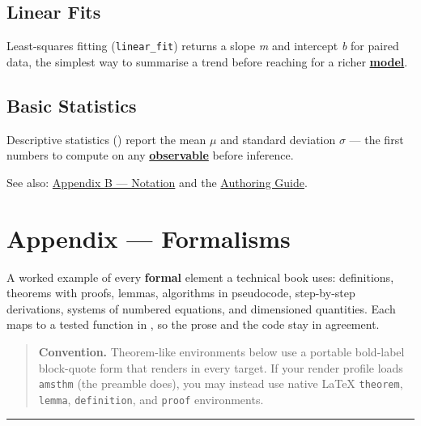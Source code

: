 \documentclass[
]{article}
\theoremstyle{plain}
\theoremstyle{definition}
\begin{document}
\subsection{Linear Fits}\label{linear-fits}

Least-squares fitting (\texttt{linear\_fit}) returns a slope \emph{m}
and intercept \emph{b} for paired data, the simplest way to summarise a
trend before reaching for a richer
\href{../glossary.md\#gl:model}{\textbf{model}}.

\subsection{Basic Statistics}\label{basic-statistics}

Descriptive statistics () report the
mean \emph{\texorpdfstring{\ensuremath{\mu}}{mu}} and standard deviation \emph{\texorpdfstring{\ensuremath{\sigma}}{sigma}} --- the first numbers to
compute on any \href{../glossary.md\#gl:observable}{\textbf{observable}}
before inference.

See also: \href{appendix_notation.md}{Appendix B --- Notation} and the
\href{appendix_authoring_guide.md}{Authoring Guide}.

\newpage

\section{Appendix --- Formalisms}\label{sec:appendix_formalisms}

A worked example of every \textbf{formal} element a technical book uses:
definitions, theorems with proofs, lemmas, algorithms in pseudocode,
step-by-step derivations, systems of numbered equations, and dimensioned
quantities. Each maps to a tested function in
, so the prose and the code stay in
agreement.

\begin{quote}
\textbf{Convention.} Theorem-like environments below use a portable
bold-label block-quote form that renders in every target. If your render
profile loads \texttt{amsthm} (the preamble does), you may instead use
native LaTeX \texttt{theorem}, \texttt{lemma}, \texttt{definition}, and
\texttt{proof} environments.
\end{quote}

\begin{center}\rule{0.5\linewidth}{0.5pt}\end{center}
\end{document}

